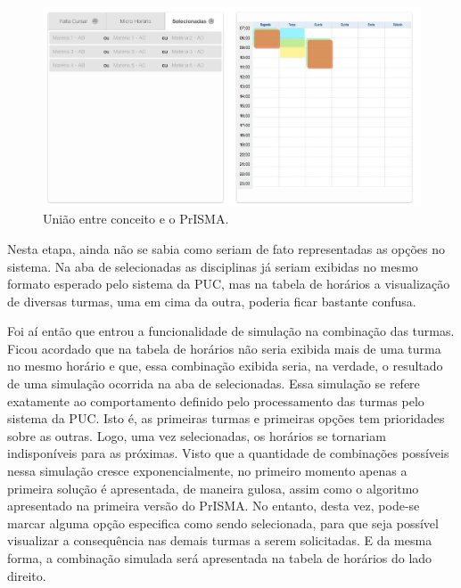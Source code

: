 \documentclass[graduacao,brazil]{ThesisPUC}
\begin{document}
\begin{figure}[H]
    \centering
    \includegraphics[width=\linewidth]{img/prisma-WF.jpg}
    \caption{União entre conceito e o PrISMA.}
\end{figure}

Nesta etapa, ainda não se sabia como seriam de fato representadas as opções no sistema. Na aba de selecionadas as disciplinas já seriam exibidas no mesmo formato esperado pelo sistema da PUC, mas na tabela de horários a visualização de diversas turmas, uma em cima da outra, poderia ficar bastante confusa.

Foi aí então que entrou a funcionalidade de simulação na combinação das turmas. Ficou acordado que na tabela de horários não seria exibida mais de uma turma no mesmo horário e que, essa combinação exibida seria, na verdade, o resultado de uma simulação ocorrida na aba de selecionadas. Essa simulação se refere exatamente ao comportamento definido pelo processamento das turmas pelo sistema da PUC. Isto é, as primeiras turmas e primeiras opções tem prioridades sobre as outras. Logo, uma vez selecionadas, os horários se tornariam indisponíveis para as próximas. 
Visto que a quantidade de combinações possíveis nessa simulação cresce exponencialmente, no primeiro momento apenas a primeira solução é apresentada, de maneira gulosa, assim como o algoritmo apresentado na primeira versão do PrISMA. No entanto, desta vez, pode-se marcar alguma opção especifica como sendo selecionada, para que seja possível visualizar a consequência nas demais turmas a serem solicitadas. E da mesma forma, a combinação simulada será apresentada na tabela de horários do lado direito.
\end{document}
